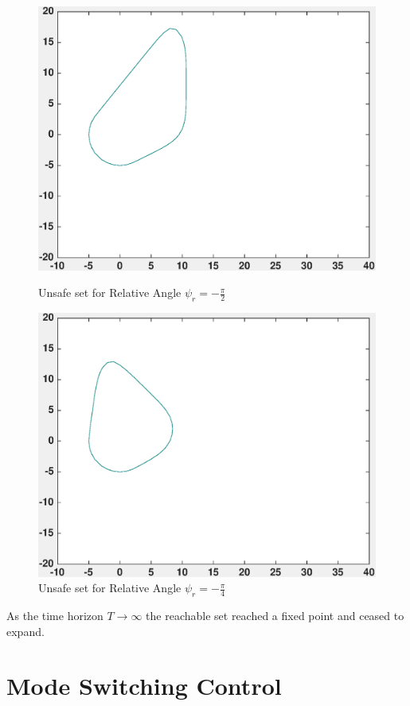 \documentclass[a4paper]{article}
\begin{document}
\begin{figure}[!ht]
  \centering
  \begin{minipage}[b]{0.4\textwidth}
    \includegraphics[width=1.0\textwidth]{velCont_psi37.eps}
    \caption{Unsafe set for Relative Angle $\psi_r = -\frac{\pi}{2}$}
  \end{minipage}
  \hfill
  \begin{minipage}[b]{0.4\textwidth}
    \includegraphics[width=1.0\textwidth]{velCont_psi43.eps}
    \caption{Unsafe set for Relative Angle $\psi_r = -\frac{\pi}{4}$}
  \end{minipage}
\end{figure}

As the time horizon $T \rightarrow \infty$ the reachable set reached a fixed point and ceased to expand.

\section{Mode Switching Control}
\end{document}
